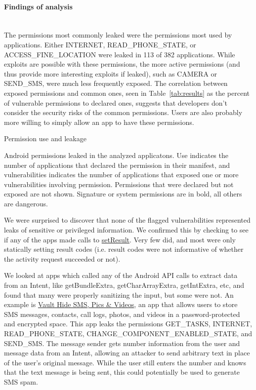 \documentclass[12pt,a4paper]{article}
\begin{document}
\paragraph{Findings of analysis} ~\\
The permissions most commonly leaked were the permissions most used by
applications. Either INTERNET, READ\_PHONE\_STATE, or ACCESS\_FINE\_LOCATION
were leaked in 113 of 382 applications. While exploits are possible with these
permissions, the more active permissions (and thus provide more interesting
exploits if leaked), such as CAMERA or SEND\_SMS, were much less frequently
exposed. The correlation between exposed permissions and common ones, seen in
Table~\ref{tab:results} as the percent of vulnerable permissions to declared
ones, suggests that developers don't consider the security risks of the common
permissions. Users are also probably more willing to simply allow an app to have
these permissions.
\begin{table}
\caption{Permission use and leakage}

\caption*{Android permissions leaked in the analyzed applicatons. Use indicates
  the number of applications that declared the permission in their manifest, and
  vulnerabilities indicates the number of applications that exposed one or more
  vulnerabilities involving permission.  Permissions that were declared but not
  exposed are not shown. Signature or system permissions are in bold, all others
  are dangerous.}\label{tab:results}
\end{table}

We were surprised to discover that none of the flagged vulnerabilities
represented leaks of sensitive or privileged information. We confirmed this by
checking to see if any of the apps made calls to
\href{https://developer.android.com/reference/android/app/Activity.html#setResult\%28int\%29}{setResult}. Very
few did, and most were only statically setting result codes (i.e. result codes
were not informative of whether the activity request succeeded or not).

We looked at apps which called any of the Android API calls to extract data from
an Intent, like getBundleExtra, getCharArrayExtra, getIntExtra, etc, and found
that many were properly sanitizing the input, but some were not. An example is
\href{https://play.google.com/store/apps/details?id=com.netqin.ps\&feature=search\_result#?t=W251bGwsMSwxLDEsImNvbS5uZXRxaW4ucHMiXQ..}{Vault
  Hide SMS, Pics \& Videos}, an app that allows users to store SMS messages,
contacts, call logs, photos, and videos in a password-protected and encrypted
space. This app leaks the permissions GET\_TASKS, INTERNET, READ\_PHONE\_STATE,
CHANGE\_COMPONENT\_ENABLED\_STATE, and SEND\_SMS. The message sender gets number
information from the user and message data from an Intent, allowing an attacker
to send arbitrary text in place of the user's original message. While the user
still enters the number and knows that the text message is being sent, this
could potentially be used to generate SMS spam.
\end{document}

